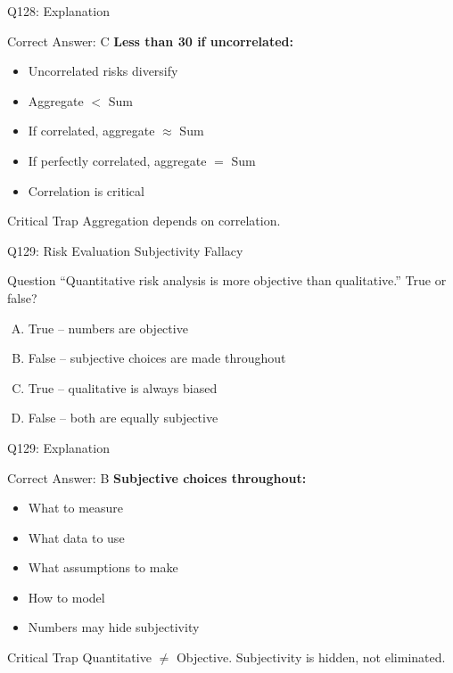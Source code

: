 \documentclass{beamer}
\begin{document}
	\begin{frame}{Q128: Explanation}
		\begin{block}{Correct Answer: C}
			\textbf{Less than 30 if uncorrelated:}
			\begin{itemize}
				\item Uncorrelated risks diversify
				\item Aggregate $<$ Sum
				\item If correlated, aggregate $\approx$ Sum
				\item If perfectly correlated, aggregate $=$ Sum
				\item Correlation is critical
			\end{itemize}
		\end{block}
		\begin{alertblock}{Critical Trap}
			Aggregation depends on correlation.
		\end{alertblock}
	\end{frame}
	
	\begin{frame}{Q129: Risk Evaluation Subjectivity Fallacy}
		\begin{block}{Question}
			``Quantitative risk analysis is more objective than qualitative.'' True or false?
		\end{block}
		\begin{enumerate}[(A)]
			\item True -- numbers are objective
			\item False -- subjective choices are made throughout
			\item True -- qualitative is always biased
			\item False -- both are equally subjective
		\end{enumerate}
	\end{frame}
	
	\begin{frame}{Q129: Explanation}
		\begin{block}{Correct Answer: B}
			\textbf{Subjective choices throughout:}
			\begin{itemize}
				\item What to measure
				\item What data to use
				\item What assumptions to make
				\item How to model
				\item Numbers may hide subjectivity
			\end{itemize}
		\end{block}
		\begin{alertblock}{Critical Trap}
			Quantitative $\neq$ Objective. Subjectivity is hidden, not eliminated.
		\end{alertblock}
	\end{frame}
	
\end{document}

